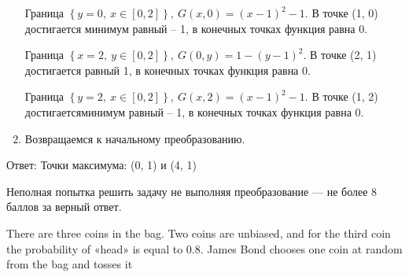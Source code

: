 \documentclass[addpoints, answers]{exam} %
\begin{document}
\begin{questions}
\begin{solution}
\begin{enumerate}
Граница $\left\{y=0,\ x\in \left[0,2\right]\right\},\ G\left(x,0\right)={\left(x-1\right)}^2-1$. В точке (1, 0) достигается минимум равный -- 1, в конечных точках функция равна 0.

Граница $\left\{x=2,\ y\in \left[0,2\right]\right\},\ G\left(0,y\right)=1-{\left(y-1\right)}^2$. В точке (2, 1) достигается \textbf{} равный 1, в конечных точках функция равна 0.

Граница $\left\{y=2,\ x\in \left[0,2\right]\right\},\ G\left(x,2\right)={\left(x-1\right)}^2-1$. В точке (1, 2) достигаетсяминимум равный -- 1, в конечных точках функция равна 0.

\item  Возвращаемся к начальному преобразованию.
\end{enumerate}

Ответ: Точки максимума: (0, 1) и (4, 1)

Неполная попытка решить задачу не выполняя преобразование — не более 8 баллов за верный ответ.

\end{solution}

\newpage

\question
There are three coins in the bag. Two coins are unbiased, and for the third coin the probability of «head» is equal to $0.8$. James Bond chooses one coin at random from the bag and tosses it



\end{questions}
\end{document}
